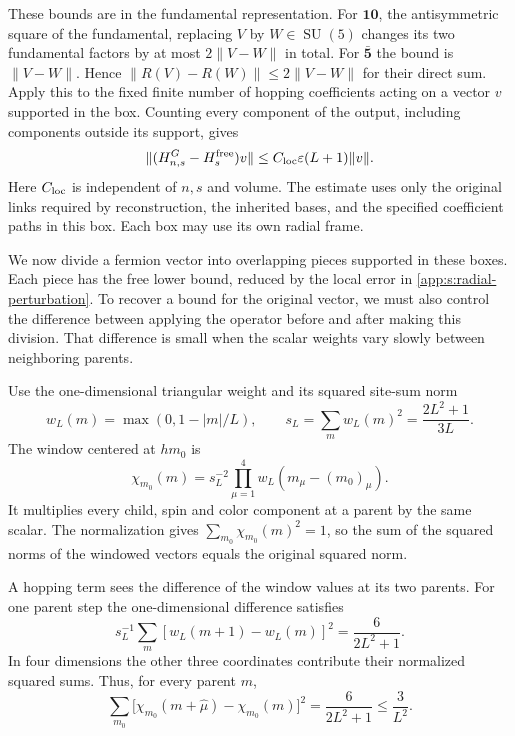 \documentclass[11pt,a4paper]{article}
\theoremstyle{remark}
\DeclareMathOperator{\SU}{SU}
\newcommand{\eps}{\varepsilon}
\begin{document}
These bounds are in the fundamental representation. For $\mathbf{10}$, the antisymmetric square of the fundamental,
replacing $V$ by $W\in\SU(5)$ changes
its two fundamental factors by at most $2\|V-W\|$ in total.
For $\bar{\mathbf5}$ the bound is $\|V-W\|$. Hence
$\|R(V)-R(W)\|\le2\|V-W\|$ for their direct sum.
Apply this to the fixed finite number of hopping coefficients acting
on a vector $v$ supported in the box. Counting every component of the
output, including components outside its support, gives
\begin{equation}
 \|(H_{n,s}^G-H_s^{\rm free})v\|
       \le C_{\rm loc}\eps(L+1)\|v\|.
 \label{app:s:radial-perturbation}
\end{equation}
Here $C_{\rm loc}$ is independent of $n,s$ and volume. The estimate
uses only the original links required by reconstruction, the inherited
bases, and the specified coefficient paths in this box. Each box may
use its own radial frame.

We now divide a fermion vector into overlapping pieces supported in
these boxes. Each piece has the free lower bound, reduced by the local
error in \eqref{app:s:radial-perturbation}. To recover a bound for the
original vector, we must also control the difference between applying
the operator before and after making this division. That difference is
small when the scalar weights vary slowly between neighboring parents.

Use the one-dimensional triangular weight and its squared site-sum norm
\begin{equation}
 w_L(m)=\max(0,1-|m|/L),\qquad
 s_L=\sum_m w_L(m)^2=\frac{2L^2+1}{3L}.
\end{equation}
The window centered at $hm_0$ is
\begin{equation}
 \chi_{m_0}(m)=s_L^{-2}\prod_{\mu=1}^4w_L(m_\mu-(m_0)_\mu).
\end{equation}
It multiplies every child, spin and color component at a parent by
the same scalar. The normalization gives
$\sum_{m_0}\chi_{m_0}(m)^2=1$, so the sum of the squared norms of
the windowed vectors equals the original squared norm.

A hopping term sees the difference of the window values at its two
parents. For one parent step the one-dimensional difference satisfies
\begin{equation}
 s_L^{-1}\sum_m [w_L(m+1)-w_L(m)]^2
                  =\frac6{2L^2+1}.
\end{equation}
In four dimensions the other three coordinates contribute their
normalized squared sums. Thus, for every parent $m$,
\begin{equation}
 \sum_{m_0}\bigl[\chi_{m_0}(m+\hat\mu)-\chi_{m_0}(m)\bigr]^2
 =\frac6{2L^2+1}\le\frac3{L^2}.
\end{equation}
\end{document}
